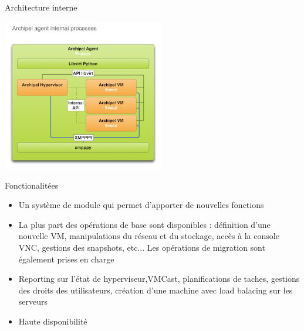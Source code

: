 \begin{frame}{Architecture interne}
\begin{center}
\includegraphics[width=200pt]{images_presentation/intern.png}
\end{center}
\end{frame}

\begin{frame}{Fonctionalitées}
\begin{itemize}
\item Un système de module qui permet d'apporter de nouvelles fonctions
\pause
\item La plus part des opérations de base sont disponibles : définition d'une nouvelle VM, manipulations du réseau et du stockage,
accès à la console VNC, gestions des snapshots, etc... 
Les opérations de migration sont également prises en charge
\pause
\item Reporting sur l'état de hyperviseur,VMCast, planifications de taches, gestions des droits des
utilisateurs, création d'une machine avec load balacing sur les serveurs
\pause
\item Haute disponibilité
\end{itemize}

\end{frame}

